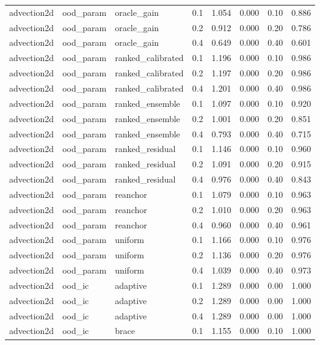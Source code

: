 \begin{tabular}{llllrrrr}
advection2d & ood\_param & oracle\_gain & 0.1 & 1.054 & 0.000 & 0.10 & 0.886 \\
advection2d & ood\_param & oracle\_gain & 0.2 & 0.912 & 0.000 & 0.20 & 0.786 \\
advection2d & ood\_param & oracle\_gain & 0.4 & 0.649 & 0.000 & 0.40 & 0.601 \\
advection2d & ood\_param & ranked\_calibrated & 0.1 & 1.196 & 0.000 & 0.10 & 0.986 \\
advection2d & ood\_param & ranked\_calibrated & 0.2 & 1.197 & 0.000 & 0.20 & 0.986 \\
advection2d & ood\_param & ranked\_calibrated & 0.4 & 1.201 & 0.000 & 0.40 & 0.986 \\
advection2d & ood\_param & ranked\_ensemble & 0.1 & 1.097 & 0.000 & 0.10 & 0.920 \\
advection2d & ood\_param & ranked\_ensemble & 0.2 & 1.001 & 0.000 & 0.20 & 0.851 \\
advection2d & ood\_param & ranked\_ensemble & 0.4 & 0.793 & 0.000 & 0.40 & 0.715 \\
advection2d & ood\_param & ranked\_residual & 0.1 & 1.146 & 0.000 & 0.10 & 0.960 \\
advection2d & ood\_param & ranked\_residual & 0.2 & 1.091 & 0.000 & 0.20 & 0.915 \\
advection2d & ood\_param & ranked\_residual & 0.4 & 0.976 & 0.000 & 0.40 & 0.843 \\
advection2d & ood\_param & reanchor & 0.1 & 1.079 & 0.000 & 0.10 & 0.963 \\
advection2d & ood\_param & reanchor & 0.2 & 1.010 & 0.000 & 0.20 & 0.963 \\
advection2d & ood\_param & reanchor & 0.4 & 0.960 & 0.000 & 0.40 & 0.961 \\
advection2d & ood\_param & uniform & 0.1 & 1.166 & 0.000 & 0.10 & 0.976 \\
advection2d & ood\_param & uniform & 0.2 & 1.136 & 0.000 & 0.20 & 0.976 \\
advection2d & ood\_param & uniform & 0.4 & 1.039 & 0.000 & 0.40 & 0.973 \\
\midrule
advection2d & ood\_ic & adaptive & 0.1 & 1.289 & 0.000 & 0.00 & 1.000 \\
advection2d & ood\_ic & adaptive & 0.2 & 1.289 & 0.000 & 0.00 & 1.000 \\
advection2d & ood\_ic & adaptive & 0.4 & 1.289 & 0.000 & 0.00 & 1.000 \\
advection2d & ood\_ic & brace & 0.1 & 1.155 & 0.000 & 0.10 & 1.000 \\

\end{tabular}
